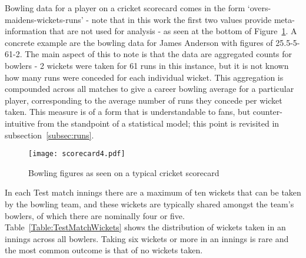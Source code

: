 \documentclass{statsoc}
\begin{document}
Bowling data for a player on a cricket scorecard comes in the form `overs-maidens-wickets-runs' - note that in this work the first two values provide meta-information that are not used for analysis -  as seen at the bottom of Figure~\ref{bowlingfigs}. A concrete example are the bowling data for James Anderson with figures of 25.5-5-61-2. The main aspect of this to note is that the data are aggregated counts for bowlers - 2 wickets were taken for 61 runs in this instance, but it is not known how many runs were conceded for each individual wicket. This aggregation is compounded across all matches to give a career bowling average for a particular player, corresponding to the average number of runs they concede per wicket taken. This measure is of a form that is understandable to fans, but counter-intuitive from the standpoint of a statistical model; this point is revisited in subsection~\ref{subsec:runs}.
\begin{figure}%
    \centering
\texttt{[image: scorecard4.pdf]}
\caption{Bowling figures as seen on a typical cricket scorecard}
\label{bowlingfigs}
\end{figure}

In each Test match innings there are a maximum of ten wickets that can be taken by the bowling team, and these wickets are typically shared amongst the team's bowlers, of which there are nominally four or five. Table~\ref{Table:TestMatchWickets} shows the distribution of wickets taken in an innings across all bowlers. Taking six wickets or more in an innings is rare and the most common outcome is that of no wickets taken. 

\begin{table}%
\caption{\label{Table:TestMatchWickets}Frequency and percentage of Test match wickets per innings}%
\centering
{}
\end{table}
\end{document}
